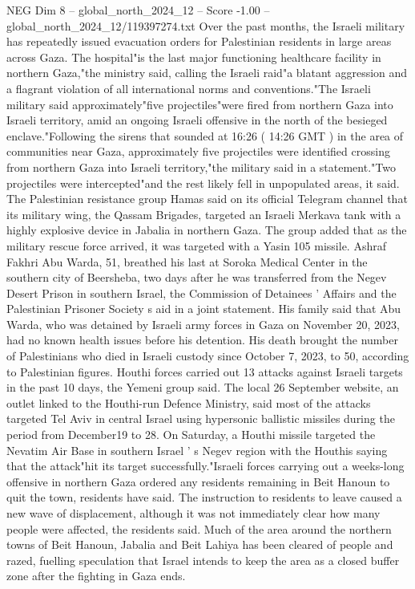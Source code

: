 \begin{textsample}{NEG Dim 8 – global\_north\_2024\_12 – Score -1.00 – global\_north\_2024\_12/119397274.txt}
Over the past months, the Israeli military has repeatedly issued evacuation orders for Palestinian residents in large areas across Gaza.
The hospital"is the last major functioning healthcare facility in northern Gaza,"the ministry said, calling the Israeli raid"a blatant aggression and a flagrant violation of all international norms and conventions."The Israeli military said approximately"five projectiles"were fired from northern Gaza into Israeli territory, amid an ongoing Israeli offensive in the north of the besieged enclave."Following the sirens that sounded at 16:26 ( 14:26 GMT ) in the area of communities near Gaza, approximately five projectiles were identified crossing from northern Gaza into Israeli territory,"the military said in a statement."Two projectiles were intercepted"and the rest likely fell in unpopulated areas, it said.
The Palestinian resistance group Hamas said on its official Telegram channel that its military wing, the Qassam Brigades, targeted an Israeli Merkava tank with a highly explosive device in Jabalia in northern Gaza.
The group added that as the military rescue force arrived, it was targeted with a Yasin 105 missile.
Ashraf Fakhri Abu Warda, 51, breathed his last at Soroka Medical Center in the southern city of Beersheba, two days after he was transferred from the Negev Desert Prison in southern Israel, the Commission of Detainees ' Affairs and the Palestinian Prisoner Society s aid in a joint statement.
His family said that Abu Warda, who was detained by Israeli army forces in Gaza on November 20, 2023, had no known health issues before his detention.
His death brought the number of Palestinians who died in Israeli custody since October 7, 2023, to 50, according to Palestinian figures.
Houthi forces carried out 13 attacks against Israeli targets in the past 10 days, the Yemeni group said.
The local 26 September website, an outlet linked to the Houthi-run Defence Ministry, said most of the attacks targeted Tel Aviv in central Israel using hypersonic ballistic missiles during the period from December19 to 28.
On Saturday, a Houthi missile targeted the Nevatim Air Base in southern Israel ' s Negev region with the Houthis saying that the attack"hit its target successfully."Israeli forces carrying out a weeks-long offensive in northern Gaza ordered any residents remaining in Beit Hanoun to quit the town, residents have said.
The instruction to residents to leave caused a new wave of displacement, although it was not immediately clear how many people were affected, the residents said.
Much of the area around the northern towns of Beit Hanoun, Jabalia and Beit Lahiya has been cleared of people and razed, fuelling speculation that Israel intends to keep the area as a closed buffer zone after the fighting in Gaza ends.

\end{textsample}
